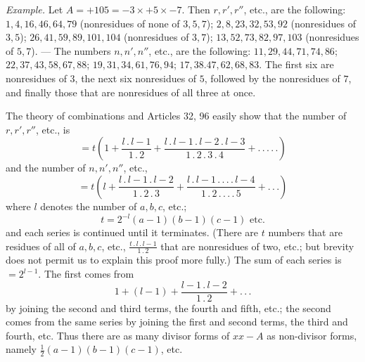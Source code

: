 \textit{Example.} Let $A=+105=-3\times+5\times-7$. Then $r,r',r''$, etc., are the following: $1,\allowbreak{}4,\allowbreak{}16,\allowbreak{}46,\allowbreak{}64,\allowbreak{}79$ (nonresidues of none of $3,\allowbreak{}5,\allowbreak{}7$); $2,\allowbreak{}8,\allowbreak{}23,\allowbreak{}32,\allowbreak{}53,\allowbreak{}92$ (nonresidues of $3,\allowbreak{}5$); $26,\allowbreak{}41,\allowbreak{}59,\allowbreak{}89,\allowbreak{}101,\allowbreak{}104$ (nonresidues of $3,\allowbreak{}7$); $13,\allowbreak{}52,\allowbreak{}73,\allowbreak{}82,\allowbreak{}97,\allowbreak{}103$ (nonresidues of $5,\allowbreak{}7$). --- The numbers $n,n',n''$, etc., are the following: $11,\allowbreak{}29,\allowbreak{}44,\allowbreak{}71,\allowbreak{}74,\allowbreak{}86$; $22,\allowbreak{}37,\allowbreak{}43,\allowbreak{}58,\allowbreak{}67,\allowbreak{}88$; $19,\allowbreak{}31,\allowbreak{}34,\allowbreak{}61,\allowbreak{}76,\allowbreak{}94$; $17,\allowbreak{}38.47,\allowbreak{}62,\allowbreak{}68,\allowbreak{}83$. The first six are nonresidues of $3$, the next six nonresidues of $5$, followed by the nonresidues of $7$, and finally those that are nonresidues of all three at once.

The theory of combinations and Articles 32, 96 easily show that the number of $r,r',r''$, etc., is
\[
=t\left(1+\frac{l\, .\, l-1}{1\, .\, 2}+\frac{l\, .\, l-1\, .\, l-2\, .\, l-3}{1\, .\, 2\, .\, 3\, .\, 4}+ .\, .\, .\, .\, .\right)
\]
and the number of $n,n',n''$, etc.,
\[
=t\left(l+\frac{l\, .\, l-1\, .\, l-2}{1\, .\, 2\, .\, 3}+\frac{l\, .\, l-1\, .\, .\, .\, .\, l-4}{1\, .\, 2\, .\, .\, .\, .\, 5}+ .\, .\, .\right)
\]
where $l$ denotes the number of $a,b,c$, etc.;
\[
t=2^{-l}(a-1)(b-1)(c-1)\text{ etc.}
\]
and each series is continued until it terminates. (There are $t$ numbers that are residues of all of $a,b,c$, etc., $\frac{t\, .\, l\, .\, l-1}{1\, .\, 2}$ that are nonresidues of two, etc.; but brevity does not permit us to explain this proof more fully.) The sum of each series is $=2^{l-1}$. The first comes from
\[
1+(l-1)+\frac{l-1\, .\, l-2}{1\, .\, 2}+ .\, .\, .
\]
by joining the second and third terms, the fourth and fifth, etc.; the second comes from the same series by joining the first and second terms, the third and fourth, etc. Thus there are as many divisor forms of $xx-A$ as non-divisor forms, namely $\frac{1}{2}(a-1)(b-1)(c-1)$, etc.

